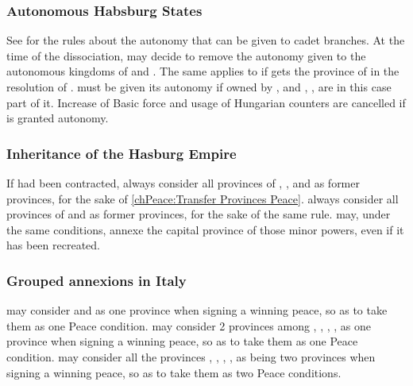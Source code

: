 \subsubsection{Autonomous Habsburg States}
\aparag See  for the rules about
the autonomy that can be given to cadet branches.
\aparag At the time of the dissociation, \HAB may decide to remove the
autonomy given to the autonomous kingdoms of  and
. The same applies to  if \HAB gets the
province of  in the resolution of
.
\aparag[Sicilia]  must be given its autonomy if owned by \HAB, and
, ,  are in this
case part of it.
\aparag[Hungary] Increase of Basic force and usage of Hungarian counters
are cancelled if  is granted autonomy.

\subsubsection{Inheritance of the Hasburg Empire}
\aparag If  had been contracted, \HAB
always consider all provinces of ,
,  and
 as former provinces, for the sake of
\ref{chPeace:Transfer Provinces Peace}.
\aparag \HAB  always consider all provinces of  
and  as  former
provinces, for the sake of the same rule.
\aparag \HAB may, under the same conditions, annexe the capital province of
those minor powers, even if it has been recreated.

\subsubsection{Grouped annexions in Italy}
\aparag \HAB may consider  and 
as one province when signing a winning peace, so as to take them as one
Peace condition.
\aparag \HAB may consider 2 provinces among ,
, , ,
 as one province when signing a winning peace, so as
to take them as one Peace condition.
\aparag \HAB may consider all the provinces ,
, , ,
 as being two provinces when signing a winning peace,
so as to take them as two Peace conditions.



